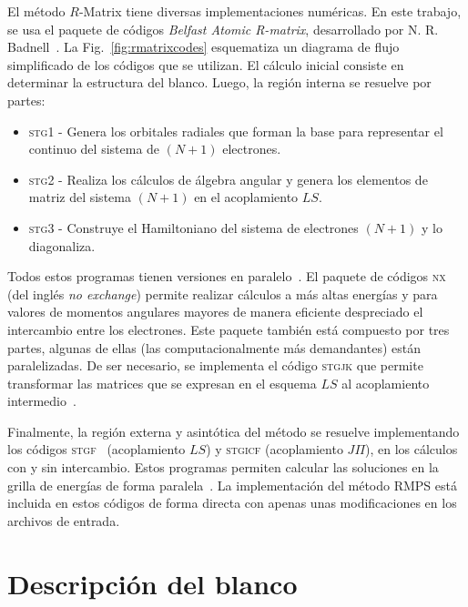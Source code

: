 El método $R$-Matrix tiene diversas implementaciones numéricas. En este 
trabajo, se usa el paquete de códigos \textit{Belfast Atomic R-matrix}, 
desarrollado por N. R. Badnell~\cite{QUB-Badnell}. 
La Fig.~\ref{fig:rmatrixcodes} esquematiza un diagrama de flujo 
simplificado de los códigos que se utilizan. El cálculo inicial consiste 
en determinar la estructura del blanco. Luego, la región interna se 
resuelve por partes: 
\begin{itemize}
\item \textsc{stg1} - Genera los orbitales radiales que forman la base
para representar el continuo del sistema de $(N+1)$ electrones.
\item \textsc{stg2} - Realiza los cálculos de álgebra angular y genera 
los elementos de matriz del sistema $(N+1)$ en el acoplamiento $LS$.
\item \textsc{stg3} - Construye el Hamiltoniano del sistema de 
electrones $(N+1)$ y lo diagonaliza.
\end{itemize}
Todos estos programas tienen versiones en paralelo~\cite{Mitnik:99,
Mitnik:01,Ballance:04}. 
El paquete de códigos \textsc{nx}~\cite{Burke:92} (del inglés 
\textit{no exchange}) permite realizar cálculos a más altas energías y 
para valores de momentos angulares mayores de manera eficiente 
despreciado el intercambio entre los electrones. Este paquete también 
está compuesto por tres partes, algunas de ellas (las computacionalmente 
más demandantes) están paralelizadas. De ser necesario, se implementa el 
código \textsc{stgjk} que permite transformar las matrices que se 
expresan en el esquema $LS$ al acoplamiento intermedio~\cite{Griffin:98}.

Finalmente, la región externa y asintótica del método se resuelve 
implementando los códigos \textsc{stgf}~\cite{Seaton:85} (acoplamiento 
$LS$) y \textsc{stgicf} (acoplamiento $J\Pi$), en los cálculos con y sin 
intercambio. Estos programas permiten calcular las soluciones en la 
grilla de energías de forma 
paralela~\cite{Mitnik:99,FernandezMenchero:20}. La implementación del 
método RMPS está incluida en estos códigos de forma directa con apenas 
unas modificaciones en los archivos de entrada.

\section{Descripción del blanco}
\label{sec:target-rmatrix}

